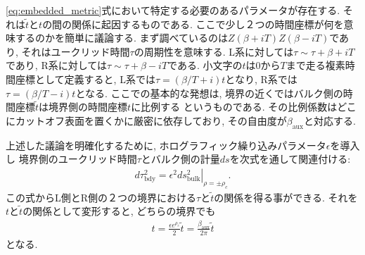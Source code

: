 \eqref{eq:embedded_metric}式において特定する必要のあるパラメータが存在する. 
それは$\tilde{t}$と$t$の間の関係に起因するものである. 
ここで少し２つの時間座標が何を意味するのかを簡単に議論する. 
まず調べているのは$Z(\beta + iT)Z(\beta - iT)$であり, それはユークリッド時間$\tau$の周期性を意味する. 
L系に対しては$\tau \sim \tau + \beta + iT$であり, 
R系に対しては$\tau \sim \tau + \beta - iT$である. 
小文字の$t$は0から$T$まで走る複素時間座標として定義すると, 
L系では$\tau = (\beta / T + i)t$となり, 
R系では$\tau = (\beta / T - i)t$となる. 
ここでの基本的な発想は, 境界の近くではバルク側の時間座標$\tilde{t}$は境界側の時間座標$t$に比例する
というものである. 
その比例係数はどこにカットオフ表面を置くかに厳密に依存しており, その自由度が$\beta_{\mathrm{aux}}$と対応する. 

上述した議論を明確化するために, ホログラフィック繰り込みパラメータ$\epsilon$を導入し
境界側のユークリッド時間$\tau$とバルク側の計量$ds$を次式を通して関連付ける:
\begin{align}
	d\tau^2_{\mathrm{bdy}} = \left.\epsilon^2ds^2_{\mathrm{bulk}}\right|_{\rho = \pm\rho_c}.
\end{align}
この式からL側とR側の２つの境界における$\tau$と$\tilde{t}$の関係を得る事ができる. 
それを$t$と$\tilde{t}$の関係として変形すると, どちらの境界でも
\begin{align}
	t = \frac{\epsilon e^{\rho_c}}{2}\tilde{t} = \frac{\beta_{\mathrm{aux}}}{2\pi}\tilde{t}
\end{align}
となる. 


\pagebreak